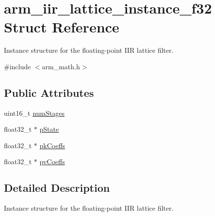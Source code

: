 \hypertarget{structarm__iir__lattice__instance__f32}{\section{arm\-\_\-iir\-\_\-lattice\-\_\-instance\-\_\-f32 Struct Reference}
\label{structarm__iir__lattice__instance__f32}
}


Instance structure for the floating-\/point I\-I\-R lattice filter.  




{\ttfamily \#include $<$arm\-\_\-math.\-h$>$}

\subsection*{Public Attributes}
\begin{DoxyCompactItemize}
\item 
uint16\-\_\-t \hyperlink{structarm__iir__lattice__instance__f32_af8de449af5efe1f30be82f9ba35587ee}{num\-Stages}
\item 
float32\-\_\-t $\ast$ \hyperlink{structarm__iir__lattice__instance__f32_a30babe7815510219e6e3d28e6e4a5969}{p\-State}
\item 
float32\-\_\-t $\ast$ \hyperlink{structarm__iir__lattice__instance__f32_aa69fcdd3775e828d450ce1bbd978fa31}{pk\-Coeffs}
\item 
float32\-\_\-t $\ast$ \hyperlink{structarm__iir__lattice__instance__f32_afc7c8f577e6f27d097fe55f57e707f72}{pv\-Coeffs}
\end{DoxyCompactItemize}


\subsection{Detailed Description}
Instance structure for the floating-\/point I\-I\-R lattice filter. 

